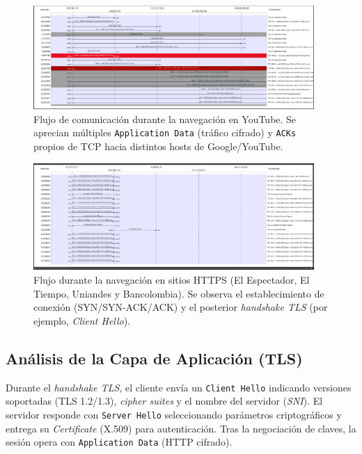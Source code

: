 \documentclass[10pt]{article}
\begin{document}
\begin{figure}[H]
    \centering
    \includegraphics[width=0.95\textwidth]{lab-02-screenshots/8.5-YouTube-flow.png}
    \caption{Flujo de comunicación durante la navegación en YouTube. Se aprecian múltiples \texttt{Application Data} (tráfico cifrado) y \texttt{ACKs} propios de TCP hacia distintos hosts de Google/YouTube.}
\end{figure}

\begin{figure}[H]
    \centering
    \includegraphics[width=0.95\textwidth]{lab-02-screenshots/8.5-HTTPS-flow.png}
    \caption{Flujo durante la navegación en sitios HTTPS (El Espectador, El Tiempo, Uniandes y Bancolombia). Se observa el establecimiento de conexión (SYN/SYN-ACK/ACK) y el posterior \textit{handshake TLS} (por ejemplo, \textit{Client Hello}).}
\end{figure}

\subsection*{Análisis de la Capa de Aplicación (TLS)}

Durante el \textit{handshake TLS}, el cliente envía un \texttt{Client Hello} indicando versiones soportadas (TLS 1.2/1.3), \textit{cipher suites} y el nombre del servidor (\textit{SNI}). 
El servidor responde con \texttt{Server Hello} seleccionando parámetros criptográficos y entrega su \textit{Certificate} (X.509) para autenticación. 
Tras la negociación de claves, la sesión opera con \texttt{Application Data} (HTTP cifrado).
\end{document}
